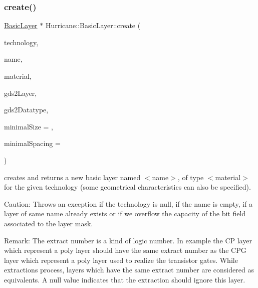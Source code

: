 \subsubsection{\texorpdfstring{create()}{create()}}
{\footnotesize\ttfamily \hyperlink{classHurricane_1_1BasicLayer}{Basic\+Layer} $\ast$ Hurricane\+::\+Basic\+Layer\+::create (\begin{DoxyParamCaption}\item[{\hyperlink{classHurricane_1_1Technology}{Technology} $\ast$}]{technology,  }\item[{const \hyperlink{classHurricane_1_1Name}{Name} \&}]{name,  }\item[{const \hyperlink{classHurricane_1_1BasicLayer_1_1Material}{Material} \&}]{material,  }\item[{unsigned}]{gds2\+Layer,  }\item[{unsigned}]{gds2\+Datatype,  }\item[{const \hyperlink{group__DbUGroup_ga4fbfa3e8c89347af76c9628ea06c4146}{Db\+U\+::\+Unit} \&}]{minimal\+Size = {},  }\item[{const \hyperlink{group__DbUGroup_ga4fbfa3e8c89347af76c9628ea06c4146}{Db\+U\+::\+Unit} \&}]{minimal\+Spacing = {} }\end{DoxyParamCaption})\hspace{0.3cm}{\ttfamily [static]}}

creates and returns a new basic layer named {\ttfamily $<$name$>$}, of type {\ttfamily $<$material$>$} for the given technology (some geometrical characteristics can also be specified).

\begin{DoxyParagraph}{Caution\+:}
Throws an exception if the technology is null, if the name is empty, if a layer of same name already exists or if we overflow the capacity of the bit field associated to the layer mask.
\end{DoxyParagraph}
\begin{DoxyParagraph}{Remark\+:}
The extract number is a kind of logic number. In example the CP layer which represent a poly layer should have the same extract number as the C\+PG layer which represent a poly layer used to realize the transistor gates. While extractions process, layers which have the same extract number are considered as equivalents. A null value indicates that the extraction should ignore this layer. 
\end{DoxyParagraph}
\mbox{\label{classHurricane_1_1BasicLayer_aeb7fd37db4ecf8e56e1992d6350fac58}} 
